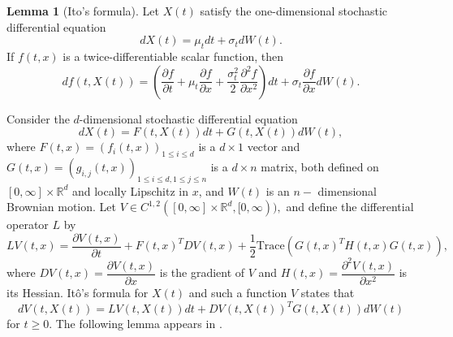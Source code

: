 \documentclass[12pt,a4paper,reqno]{amsart}
\theoremstyle{definition}
\newtheorem{lemma}[theorem]{Lemma}
\theoremstyle{remark}
\theoremstyle{plain}
\begin{document}
\begin{lemma}[Ito's formula]\label{lem:ito}
Let $X(t)$ satisfy the one-dimensional stochastic differential equation
$$
    dX({t})=\mu_{t}dt+\sigma_{t}dW({t}).
$$
       If $f\left(t,x\right)$ is a twice-differentiable scalar function, then
$$
    df(t,X(t))=\left(\frac{\partial f}{\partial t}+\mu_{t}\frac{\partial f}{\partial x}+\frac{\sigma_{t}^{2}}{2}\frac{\partial^{2}f}{\partial x^{2}}\right)dt+\sigma_{t}\frac{\partial f}{\partial x}dW(t).
$$

\end{lemma}

Consider the $d$-dimensional stochastic differential equation
$$
dX(t)=F(t,X(t)) dt + G(t,X(t)) dW(t),
$$
where $F(t,x)=\left(f_{i}(t,x)\right)_{1\leq i\leq d}$ is a $d\times 1$ vector and $G(t,x)=\left(g_{i,j}(t,x)\right)_{1\leq i\leq d,1\leq j\leq n}$ is a $d\times n$ matrix, both defined on $[0,\infty]\times \mathbb{R}^d$ and locally Lipschitz in $x$, and $W(t)$ is an $n-$ dimensional Brownian motion. Let $V \in C^{1,2}([0,\infty]\times \mathbb{R}^d,[0,\infty)),$ and define the differential operator $L$ by $$LV(t,x)=\dfrac{\partial V(t,x)}{\partial t}+F(t,x)^T DV(t,x) +\frac12 \text{Trace}(G(t,x)^T  H(t,x) G(t,x) ),$$ where $DV(t,x)=\dfrac{\partial V(t,x)}{\partial x}$ is the gradient of $V$ and $H(t,x)=\dfrac{\partial^2 V(t,x)}{\partial x^2}$ is its Hessian. It\^o's formula for $X(t)$ and such a function $V$ states that $$dV(t,X(t))=LV(t,X(t))dt+DV(t,X(t))^T G(t,X(t)) dW(t)$$ for $t\geq 0$. The following lemma appears in \cite{mao2011stochastic}.

 
\end{document}
